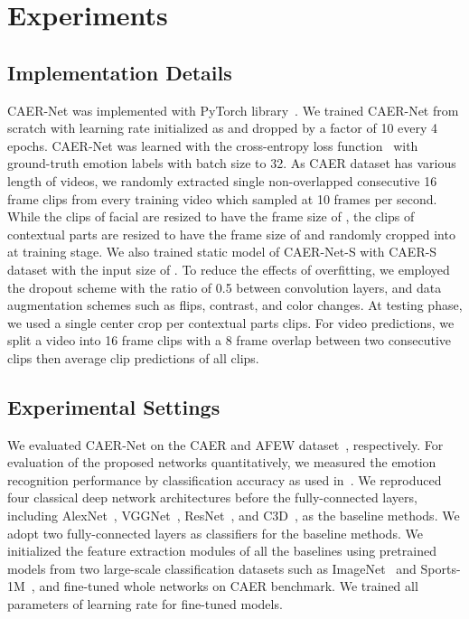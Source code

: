 \documentclass[10pt,twocolumn,letterpaper]{article}
\begin{document}
\section{Experiments}\label{sec:5}
\subsection{Implementation Details}\label{sec:51}
CAER-Net was implemented with PyTorch library~\cite{paszke2017automatic}.
We trained CAER-Net from scratch with learning rate initialized as  and dropped by a factor of 10 every 4 epochs.
CAER-Net was learned with the cross-entropy loss function~\cite{kim2019unified} with ground-truth emotion labels with batch size to 32.
As CAER dataset has various length of videos, we randomly extracted single non-overlapped consecutive 16 frame clips from every training video which sampled at 10 frames per second.
While the clips of facial  are resized to have the frame size of , the clips of contextual parts  are resized to have the frame size of  and randomly cropped into  at training stage.
We also trained static model of CAER-Net-S with CAER-S dataset with the input size of .
To reduce the effects of overfitting, we employed the dropout scheme with the ratio of 0.5 between  convolution layers, and data augmentation schemes such as flips, contrast, and color changes.
At testing phase, we used a single center crop per contextual parts clips.
For video predictions, we split a video into 16 frame clips with a 8 frame overlap between two consecutive clips then average clip predictions of all clips.


\subsection{Experimental Settings}\label{sec:51}
We evaluated CAER-Net on the CAER and AFEW dataset~\cite{dhall2011acted}, respectively.
For evaluation of the proposed networks quantitatively, we measured the emotion recognition performance by classification accuracy as used in~\cite{dhall2016emotiw}.
We reproduced four classical deep network architectures before the fully-connected layers, including AlexNet~\cite{krizhevsky2012imagenet}, VGGNet~\cite{simonyan2014very}, ResNet~\cite{he2016deep}, and C3D~\cite{tran2015learning}, as the baseline methods.
We adopt two fully-connected layers as classifiers for the baseline methods.
We initialized the feature extraction modules of all the baselines using pretrained models from two large-scale classification datasets such as ImageNet~\cite{deng2009imagenet} and Sports-1M~\cite{karpathy2014large}, and fine-tuned whole networks on CAER benchmark.
We trained all parameters of learning rate  for fine-tuned models.
\end{document}
